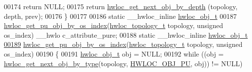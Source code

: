 \begin{DoxyCode}
00174     \textcolor{keywordflow}{return} NULL;
00175   \textcolor{keywordflow}{return} \hyperlink{a00053_gab7c1dce3f42ece5bfa621e87cf332418}{hwloc_get_next_obj_by_depth} (topology, depth, prev);
00176 \}
00177 
00186 \textcolor{keyword}{static} \_\_hwloc\_inline \hyperlink{a00016}{hwloc_obj_t}
00187 \hyperlink{a00053_ga0bc54225b65d557c70c7cb5dfb714de7}{hwloc_get_pu_obj_by_os_index}(\hyperlink{a00039_ga9d1e76ee15a7dee158b786c30b6a6e38}{hwloc_topology_t} topology, \textcolor{keywordtype}{unsigned} os\_index) \_\_hwlo
      c\_attribute\_pure;
00188 \textcolor{keyword}{static} \_\_hwloc\_inline \hyperlink{a00016}{hwloc_obj_t}
\hypertarget{a00031_source_l00189}{}\hyperlink{a00053_ga0bc54225b65d557c70c7cb5dfb714de7}{00189} \hyperlink{a00053_ga0bc54225b65d557c70c7cb5dfb714de7}{hwloc_get_pu_obj_by_os_index}(\hyperlink{a00039_ga9d1e76ee15a7dee158b786c30b6a6e38}{hwloc_topology_t} topology, \textcolor{keywordtype}{unsigned} os\_index)
00190 \{
00191   \hyperlink{a00016}{hwloc_obj_t} obj = NULL;
00192   \textcolor{keywordflow}{while} ((obj = \hyperlink{a00053_ga5f08ceb69375341e73563cfe2e77534e}{hwloc_get_next_obj_by_type}(topology, \hyperlink{a00041_ggacd37bb612667dc437d66bfb175a8dc55abca6887e80cb291353b0a0c1da83f661}{HWLOC_OBJ_PU}, obj)) != NULL)
      

\end{DoxyCode}
